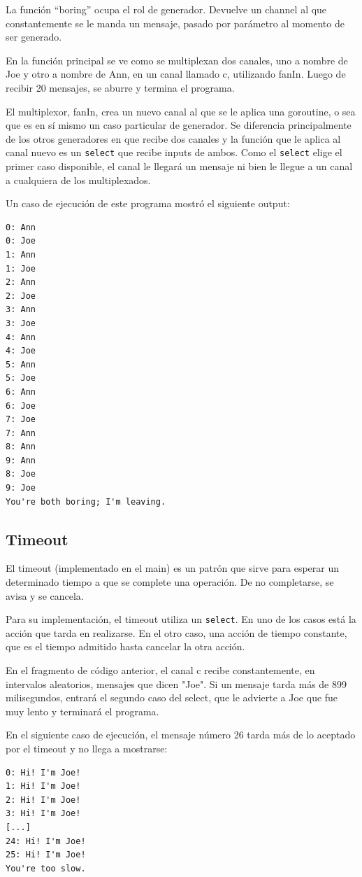 \documentclass{article}
\begin{document}
La función ``boring'' ocupa el rol de generador. Devuelve un channel al que constantemente se le manda un mensaje, pasado por parámetro al momento de ser generado.

En la función principal se ve como se multiplexan dos canales, uno a nombre de Joe y otro a nombre de Ann, en un canal llamado c, utilizando fanIn. Luego de recibir 20 mensajes, se aburre y termina el programa.

El multiplexor, fanIn, crea un nuevo canal al que se le aplica una goroutine, o sea que es en sí mismo un caso particular de generador. Se diferencia principalmente de los otros generadores en que recibe dos canales y la función que le aplica al canal nuevo es un \lstinline|select| que recibe inputs de ambos. Como el \lstinline|select| elige el primer caso disponible, el canal le llegará un mensaje ni bien le llegue a un canal a cualquiera de los multiplexados.

Un caso de ejecución de este programa mostró el siguiente output:
\begin{verbatim}
0: Ann 
0: Joe 
1: Ann 
1: Joe 
2: Ann 
2: Joe 
3: Ann 
3: Joe 
4: Ann 
4: Joe 
5: Ann 
5: Joe 
6: Ann 
6: Joe 
7: Joe 
7: Ann 
8: Ann 
9: Ann 
8: Joe 
9: Joe 
You're both boring; I'm leaving.
\end{verbatim}

\subsection{Timeout}
El timeout (implementado en el main) es un patrón que sirve para esperar un determinado tiempo a que se complete una operación. De no completarse, se avisa y se cancela.


Para su implementación, el timeout utiliza un \lstinline|select|. En uno de los casos está la acción que tarda en realizarse. En el otro caso, una acción de tiempo constante, que es el tiempo admitido hasta cancelar la otra acción. 

En el fragmento de código anterior, el canal c recibe constantemente, en intervalos aleatorios, mensajes que dicen "Joe". Si un mensaje tarda más de 899 milisegundos, entrará el segundo caso del select, que le advierte a Joe que fue muy lento y terminará el programa.

En el siguiente caso de ejecución, el mensaje número 26 tarda más de lo aceptado por el timeout y no llega a mostrarse:
\begin{verbatim}
0: Hi! I'm Joe!
1: Hi! I'm Joe!
2: Hi! I'm Joe!
3: Hi! I'm Joe!
[...]
24: Hi! I'm Joe!
25: Hi! I'm Joe!
You're too slow.
\end{verbatim}
\end{document}
